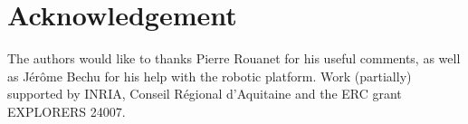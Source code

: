 \documentclass[conference]{IEEEtran}
\begin{document}
\section*{Acknowledgement}
The authors would like to thanks Pierre Rouanet for his useful comments, as well as J\'er\^{o}me Bechu for his help with the robotic platform. Work (partially) supported by INRIA, Conseil R\'egional d'Aquitaine and the ERC grant EXPLORERS 24007.



\end{document}
